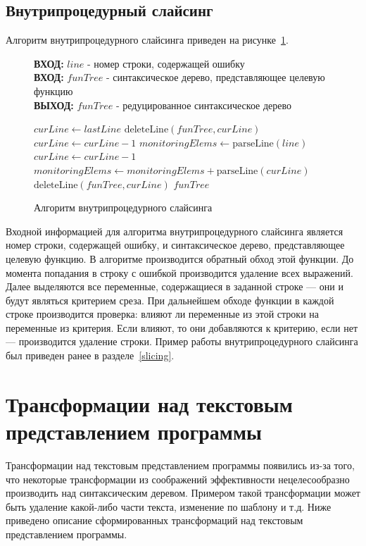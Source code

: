 \subsection{Внутрипроцедурный слайсинг}
Алгоритм внутрипроцедурного слайсинга приведен на рисунке~\ref{alg:interproceduralslicing}.
%
\begin{figure}
\textbf{ВХОД:} $line$ - номер строки, содержащей ошибку  \\
\textbf{ВХОД:} $funTree$ - синтаксическое дерево, представляющее целевую функцию \\
\textbf{ВЫХОД:} $funTree$ - редуцированное синтаксическое дерево \\
\begin{algorithmic}[1]
\STATE $curLine \leftarrow lastLine$
	\STATE $\text{deleteLine}(funTree, curLine)$
	\STATE $curLine \leftarrow curLine - 1$
\ENDWHILE
\STATE $monitoringElems \leftarrow \text{parseLine}(line)$
\STATE $curLine \leftarrow curLine - 1$
		\STATE $monitoringElems \leftarrow monitoringElems + \text{parseLine}(curLine)$ 
	\ELSE 
		\STATE $\text{deleteLine}(funTree, curLine)$ 
	\ENDIF
\ENDWHILE
\RETURN $funTree$
\end{algorithmic}
\caption{\label{alg:interproceduralslicing}Алгоритм внутрипроцедурного слайсинга}
\end{figure}
%
Входной информацией для алгоритма внутрипроцедурного слайсинга является номер строки, содержащей ошибку, и синтаксическое дерево, представляющее целевую функцию. В алгоритме производится обратный обход этой функции. До момента попадания в строку с ошибкой производится удаление всех выражений. Далее выделяются все переменные, содержащиеся в заданной строке --- они и будут являться критерием среза. При дальнейшем обходе функции в каждой строке производится проверка: влияют ли переменные из этой строки на переменные из критерия. Если влияют, то они добавляются к критерию, если нет --- производится удаление строки. Пример работы внутрипроцедурного слайсинга был приведен ранее в разделе~\ref{slicing}.

\section{Трансформации над текстовым представлением программы}
Трансформации над текстовым представлением программы появились из-за того, что некоторые трансформации из соображений эффективности нецелесообразно производить над синтаксическим деревом. Примером такой трансформации может быть удаление какой-либо части текста, изменение по шаблону и т.д. Ниже приведено описание сформированных трансформаций над текстовым представлением программы.

